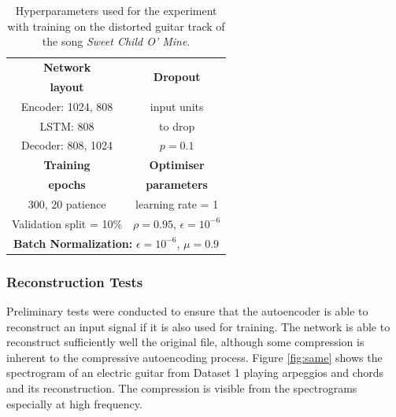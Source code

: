\begin{table}[t]
	\renewcommand{\arraystretch}{1.0}
	\caption{Hyperparameters used for the experiment with training on the distorted guitar track of the song \textit{Sweet Child O' Mine}.}
	\label{tab:sweetparams}
	\centering
	\begin{tabular}{c|c}
		\hline
		\textbf{Network}  \rule{0pt}{8pt} &  \multirow{2}{*}{\textbf{Dropout}} \\
		\textbf{layout}	  & \\
		\hline
		Encoder: 1024, 808  \rule{0pt}{8pt} &  input units \\
		LSTM: 808 &  to drop \\
		Decoder: 808, 1024 &   $p=0.1$ \\ 
		\hline
		\textbf{Training }  \rule{0pt}{8pt}  & \textbf{Optimiser} \\ 
		\textbf{epochs}	& 	 \textbf{parameters}\\ 
		\hline
		300, 20 patience  \rule{0pt}{8pt} & learning rate = 1 \\
		Validation split = 10\% &  $\rho=0.95$, $\epsilon=10^{-6}$ \\
		\hline
		\multicolumn{2}{c}{\textbf{Batch Normalization:}  $\epsilon = 10^{-6}$, $\mu=0.9$}  \rule{0pt}{8pt} \\
		\hline
	\end{tabular}
\end{table}

\subsubsection{Reconstruction Tests}

Preliminary tests were conducted to ensure that the autoencoder is able to reconstruct an input signal if it is also used for training. The network is able to reconstruct sufficiently well the original file, although some compression is inherent to the compressive autoencoding process. Figure \ref{fig:same} shows the spectrogram of an electric guitar from Dataset 1 playing arpeggios and chords and its reconstruction. The compression is visible from the spectrograms especially at high frequency.

